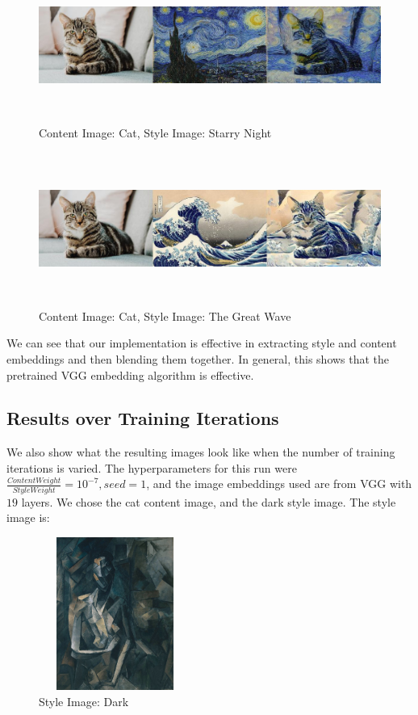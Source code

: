 \documentclass{article}
\begin{document}
\begin{figure}[H]
    \centering
    \includegraphics[height=5cm, width=15cm]{cat_van_combined}
    \caption{Content Image: Cat, Style Image: Starry Night}
    \label{fig:comb5}
\end{figure}

\begin{figure}[H]
    \centering
    \includegraphics[height=5cm, width=15cm]{cat_wave_combined}
    \caption{Content Image: Cat, Style Image: The Great Wave}
    \label{fig:comb6}
\end{figure}

\noindent We can see that our implementation is effective in extracting style and content embeddings and then blending them together. In general, this shows that the pretrained VGG embedding algorithm is effective.

\subsection{Results over Training Iterations}

We also show what the resulting images look like when the number of training iterations is varied. The hyperparameters for this run were $\frac{Content Weight}{Style Weight} = 10^{-7}, seed = 1$, and the image embeddings used are from VGG with $19$ layers. We chose the cat content image, and the dark style image. The style image is:

\begin{figure}[H]
    \centering
    \includegraphics[height=5cm,width=5cm]{dark}
    \caption{Style Image: Dark}
    \label{fig:comb6}
\end{figure}
\end{document}
